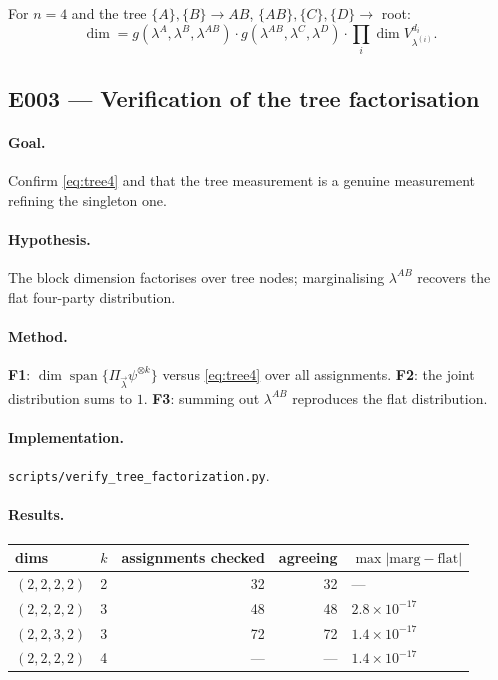 \documentclass[11pt]{article}
\theoremstyle{definition}
\theoremstyle{remark}
\newcommand{\bmlam}{\vec{\lambda}}
\begin{document}
For $n = 4$ and the tree $\{A\},\{B\} \to AB$, $\{AB\},\{C\},\{D\} \to$ root:
\begin{equation}
  \dim = g(\lambda^A,\lambda^B,\lambda^{AB}) \cdot g(\lambda^{AB},\lambda^C,\lambda^D)
         \cdot \prod_{i} \dim V^{d_i}_{\lambda^{(i)}} .
  \label{eq:tree4}
\end{equation}

\subsection{E003 --- Verification of the tree factorisation}

\paragraph{Goal.} Confirm \eqref{eq:tree4} and that the tree measurement is a genuine
measurement refining the singleton one.

\paragraph{Hypothesis.} The block dimension factorises over tree nodes; marginalising
$\lambda^{AB}$ recovers the flat four-party distribution.

\paragraph{Method.} \textbf{F1}: $\dim\operatorname{span}\{\Pi_{\bmlam}\psi^{\otimes k}\}$
versus \eqref{eq:tree4} over all assignments. \textbf{F2}: the joint distribution sums
to $1$. \textbf{F3}: summing out $\lambda^{AB}$ reproduces the flat distribution.

\paragraph{Implementation.} \texttt{scripts/verify\_tree\_factorization.py}.

\paragraph{Results.}
{
\setlength{\tabcolsep}{8pt}
\renewcommand{\arraystretch}{1.2}
\begin{tabular}{llrrl}
\toprule
dims & $k$ & assignments checked & agreeing & $\max|\text{marg} - \text{flat}|$ \\
\midrule
$(2,2,2,2)$ & 2 & 32 & 32 & --- \\
$(2,2,2,2)$ & 3 & 48 & 48 & $2.8 \times 10^{-17}$ \\
$(2,2,3,2)$ & 3 & 72 & 72 & $1.4 \times 10^{-17}$ \\
$(2,2,2,2)$ & 4 & --- & --- & $1.4 \times 10^{-17}$ \\
\bottomrule
\end{tabular}
}
\end{document}
